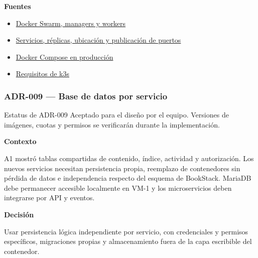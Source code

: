 \par\medskip\noindent\textbf{Fuentes}\par\nobreak\smallskip

\begin{itemize}[leftmargin=1.5em,itemsep=3pt]
\item \href{https://docs.docker.com/engine/swarm/how-swarm-mode-works/nodes/}{Docker Swarm, managers y workers}
\item \href{https://docs.docker.com/engine/swarm/services/}{Servicios, réplicas, ubicación y publicación de puertos}
\item \href{https://docs.docker.com/compose/how-tos/production/}{Docker Compose en producción}
\item \href{https://docs.k3s.io/installation/requirements}{Requisitos de k3s}
\end{itemize}

\clearpage
\subsubsection{ADR-009 — Base de datos por servicio}
\label{adr:009}

\begin{adrbox}{Estatus de ADR-009}
Aceptado para el diseño por el equipo. Versiones de imágenes, cuotas y permisos se verificarán durante la implementación.
\end{adrbox}

\par\medskip\noindent\textbf{Contexto}\par\nobreak\smallskip

A1 mostró tablas compartidas de contenido, índice, actividad y autorización. Los nuevos servicios necesitan persistencia propia, reemplazo de contenedores sin pérdida de datos e independencia respecto del esquema de BookStack. MariaDB debe permanecer accesible localmente en VM-1 y los microservicios deben integrarse por API y eventos.

\par\medskip\noindent\textbf{Decisión}\par\nobreak\smallskip

Usar persistencia lógica independiente por servicio, con credenciales y permisos específicos, migraciones propias y almacenamiento fuera de la capa escribible del contenedor.


